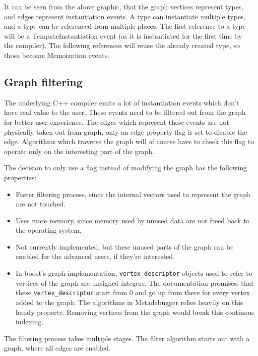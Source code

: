 It can be seen from the above graphic, that the graph vertices represent types,
and edges represent instantiation events. A type can instantiate multiple
types, and a type can be referenced from multiple places. The first reference
to a type will be a TempateInstantiation event (as it is instantiated for the
first time by the compiler). The following references will reuse the already
created type, so those become Memoization events.

\subsection{Graph filtering} \label{graph-filtering}

The underlying C++ compiler emits a lot of instantiation events which don't
have real value to the user. These events need to be filtered out from the
graph for better user experience. The edges which represent these events are
not physically taken out from graph, only an edge property flag is set to
disable the edge. Algorithms which traverse the graph will of course have to
check this flag to operate only on the interesting part of the graph.

The decision to only use a flag instead of modifying the graph has the
following properties:

\begin{itemize}
    \item
        Faster filtering process, since the internal vectors used to represent
        the graph are not touched.
    \item
        Uses more memory, since memory used by unused data are not freed back
        to the operating system.
    \item
        Not currently implemented, but these unused parts of the graph can be
        enabled for the advanced users, if they're interested.
    \item
        In boost's graph implementation, \verb|vertex_descriptor|
        objects used to refer to vertices of the graph are unsigned integers.
        The documentation promises, that these \verb|vertex_descriptor|
        start from 0 and go up from there for every vertex added to the graph.
        The algorithms in Metadebugger relies heavily on this handy property.
        Removing vertices from the graph would break this continous indexing.
\end{itemize}

The filtering process takes multiple stages. The filter algorithm starts out
with a graph, where all edges are enabled.

